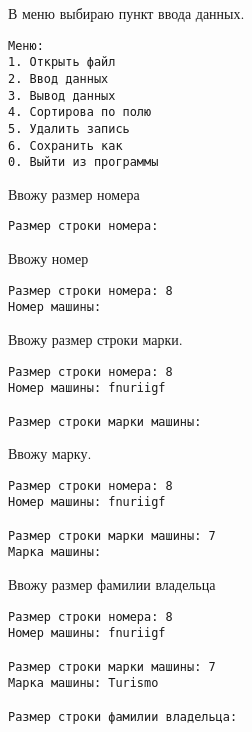 В меню выбираю пункт ввода данных.

\begin{tcolorbox}
\begin{verbatim}
Меню:
1. Открыть файл
2. Ввод данных       
3. Вывод данных      
4. Сортирова по полю 
5. Удалить запись    
6. Сохранить как     
0. Выйти из программы
\end{verbatim}
\end{tcolorbox}

Ввожу размер номера

\begin{tcolorbox}
\begin{verbatim}
Размер строки номера:
\end{verbatim}
\end{tcolorbox}

Ввожу номер

\begin{tcolorbox}
\begin{verbatim}
Размер строки номера: 8  
Номер машины:
\end{verbatim}
\end{tcolorbox}

Ввожу размер строки марки.

\begin{tcolorbox}
\begin{verbatim}
Размер строки номера: 8  
Номер машины: fnuriigf

Размер строки марки машины:
\end{verbatim}
\end{tcolorbox}

Ввожу марку.

\begin{tcolorbox}
\begin{verbatim}
Размер строки номера: 8  
Номер машины: fnuriigf

Размер строки марки машины: 7
Марка машины:
\end{verbatim}
\end{tcolorbox}

Ввожу размер фамилии владельца

\begin{tcolorbox}
\begin{verbatim}
Размер строки номера: 8  
Номер машины: fnuriigf

Размер строки марки машины: 7
Марка машины: Turismo

Размер строки фамилии владельца:
\end{verbatim}
\end{tcolorbox}

